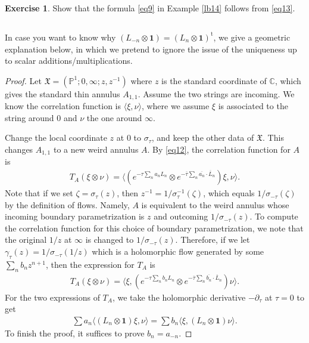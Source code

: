 \documentclass[11pt,b5paper,notitlepage]{article}
\theoremstyle{definition}
\newtheorem{exe}[df]{Exercise}
\theoremstyle{plain}
\newcommand{\fk}{\mathfrak}
\newcommand{\ovl}{\overline}
\newcommand{\tr}{\mathrm{t}} %
\newcommand{\id}{\mathbf{1}}
\newcommand{\bk}[1]{\langle {#1}\rangle}
\newcommand{\Cbb}{\mathbb C}
\newcommand{\Pbb}{\mathbb P}
\numberwithin{equation}{section}
\begin{document}
\begin{exe}
Show that the formula \eqref{eq9} in Example \ref{lb14} follows from \eqref{eq13}.
\end{exe}








\subsection{}



In case you want to know why $(L_{-n}\otimes\id)=(L_n\otimes\id)^\tr$, we give a geometric explanation below, in which we pretend to ignore the issue of the uniqueness up to scalar additions/multiplications. 


\begin{proof}
Let $\fk X=(\Pbb^1;0,\infty;z,z^{-1})$ where $z$ is the standard coordinate of $\Cbb$, which gives the standard thin annulus $A_{1,1}$. Assume the two strings are incoming.  We know the correlation function is $\bk{\xi,\nu}$, where we assume $\xi$ is associated to the string around $0$ and $\nu$ the one around $\infty$.



Change the local coordinate $z$ at $0$ to $\sigma_\tau$, and keep the other data of $\fk X$.  This changes $A_{1,1}$ to a new weird annulus $A$. By \eqref{eq12}, the correlation function for $A$ is
\begin{align*}
T_A(\xi\otimes\nu)=\bk{(e^{-\tau\sum_n a_nL_n}\otimes e^{-\ovl\tau\sum_n \ovl{a_n}\cdot \ovl L_n }) \xi,\nu}.	
\end{align*}
Note that if we set $\zeta=\sigma_\tau(z)$, then $z^{-1}=1/\sigma_\tau^{-1}(\zeta)$, which equals $1/\sigma_{-\tau}(\zeta)$ by the definition of flows. Namely, $A$ is equivalent to the weird annulus whose incoming boundary parametrization is $z$ and outcoming $1/\sigma_{-\tau}(z)$. To compute the correlation function for this choice of boundary parametrization, we note that the original $1/z$ at $\infty$ is changed to $1/\sigma_{-\tau}(z)$. Therefore, if we let $\gamma_\tau(z)=1/\sigma_{-\tau}(1/z)$ which is a holomorphic flow generated by some $\sum_n b_n z^{n+1}$, then the expression for $T_A$ is
\begin{align*}
T_A(\xi\otimes\nu)=\bk{\xi,(e^{-\tau\sum_n b_nL_n}\otimes e^{-\ovl\tau\sum_n \ovl{b_n}\cdot\ovl L_n })\nu}.	
\end{align*}
For the two expressions of $T_A$, we take the holomorphic derivative $-\partial_\tau$ at $\tau=0$ to get
\begin{align*}
\sum a_n\bk{(L_n\otimes\id)\xi,\nu}=\sum b_n\bk{\xi,(L_n\otimes\id)\nu}.	
\end{align*}
To finish the proof, it suffices to prove $b_n=a_{-n}$.


\end{proof}
\end{document}
